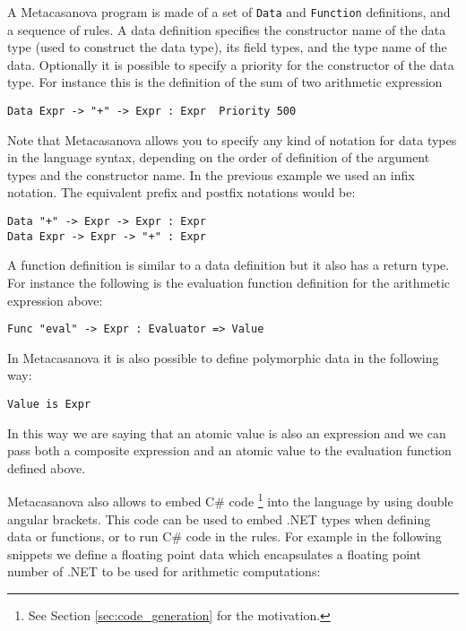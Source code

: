 A Metacasanova program is made of a set of \texttt{Data} and \texttt{Function} definitions, and a sequence of rules. A data definition specifies the constructor name of the data type (used to construct the data type), its field types, and the type name of the data. Optionally it is possible to specify a priority for the constructor of the data type. For instance this is the definition of the sum of two arithmetic expression

\begin{lstlisting}
Data Expr -> "+" -> Expr : Expr  Priority 500
\end{lstlisting}

\noindent
Note that Metacasanova allows you to specify any kind of notation for data types in the language syntax, depending on the order of definition of the argument types and the constructor name. In the previous example we used an infix notation. The equivalent prefix and postfix notations would be:

\begin{lstlisting}
Data "+" -> Expr -> Expr : Expr
Data Expr -> Expr -> "+" : Expr
\end{lstlisting}

\noindent
A function definition is similar to a data definition but it also has a return type. For instance the following is the evaluation function definition for the arithmetic expression above:

\begin{lstlisting}
Func "eval" -> Expr : Evaluator => Value
\end{lstlisting}

\noindent
In Metacasanova it is also possible to define polymorphic data in the following way:

\begin{lstlisting}
Value is Expr
\end{lstlisting}

\noindent
In this way we are saying that an atomic value is also an expression and we can pass both a composite expression and an atomic value to the evaluation function defined above.

Metacasanova also allows to embed C\# code \footnote{See Section \ref{sec:code_generation} for the motivation.} into the language by using double angular brackets. This code can be used to embed .NET types when defining data or functions, or to run C\# code in the rules. For example in the following snippets we define a floating point data which encapsulates a floating point number of .NET to be used for arithmetic computations:

